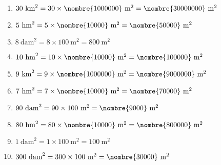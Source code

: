 \documentclass[a4paper,11pt,fleqn]{article}
\begin{document}
\begin{correction}
\exo{}

\begin{multicols}{2}
\begin{enumerate}
	\item $ 30~\text{km}^2 =  30\times\nombre{1000000}~\text{m}^2 = \nombre{30000000}~\text{m}^2$
	\item $ 5~\text{hm}^2 =  5\times\nombre{10000}~\text{m}^2 = \nombre{50000}~\text{m}^2$
	\item $ 8~\text{dam}^2 =  8\times100~\text{m}^2 = 800~\text{m}^2$
	\item $ 10~\text{hm}^2 =  10\times\nombre{10000}~\text{m}^2 = \nombre{100000}~\text{m}^2$
	\item $ 9~\text{km}^2 =  9\times\nombre{1000000}~\text{m}^2 = \nombre{9000000}~\text{m}^2$
	\item $ 7~\text{hm}^2 =  7\times\nombre{10000}~\text{m}^2 = \nombre{70000}~\text{m}^2$
	\item $ 90~\text{dam}^2 =  90\times100~\text{m}^2 = \nombre{9000}~\text{m}^2$
	\item $ 80~\text{hm}^2 =  80\times\nombre{10000}~\text{m}^2 = \nombre{800000}~\text{m}^2$
	\item $ 1~\text{dam}^2 =  1\times100~\text{m}^2 = 100~\text{m}^2$
	\item $ 300~\text{dam}^2 =  300\times100~\text{m}^2 = \nombre{30000}~\text{m}^2$
\end{enumerate}
\end{multicols}

\exo{}


\end{correction}
\end{document}
